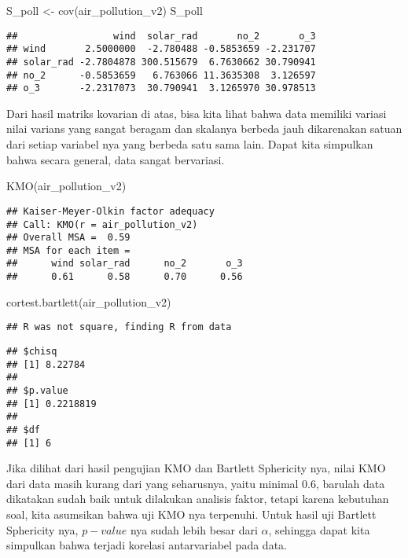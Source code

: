 \documentclass[
]{article}
\newenvironment{Shaded}{\begin{snugshade}}{\end{snugshade}}
\newcommand{\FunctionTok}[1]{\textcolor[rgb]{0.00,0.00,0.00}{#1}}
\newcommand{\NormalTok}[1]{#1}
\newcommand{\OtherTok}[1]{\textcolor[rgb]{0.56,0.35,0.01}{#1}}
\begin{document}
\begin{Shaded}
\begin{Highlighting}[]
\NormalTok{S\_poll }\OtherTok{\textless{}{-}} \FunctionTok{cov}\NormalTok{(air\_pollution\_v2)}
\NormalTok{S\_poll}
\end{Highlighting}
\end{Shaded}

\begin{verbatim}
##                 wind  solar_rad       no_2       o_3
## wind       2.5000000  -2.780488 -0.5853659 -2.231707
## solar_rad -2.7804878 300.515679  6.7630662 30.790941
## no_2      -0.5853659   6.763066 11.3635308  3.126597
## o_3       -2.2317073  30.790941  3.1265970 30.978513
\end{verbatim}

Dari hasil matriks kovarian di atas, bisa kita lihat bahwa data memiliki
variasi nilai varians yang sangat beragam dan skalanya berbeda jauh
dikarenakan satuan dari setiap variabel nya yang berbeda satu sama lain.
Dapat kita simpulkan bahwa secara general, data sangat bervariasi.

\begin{Shaded}
\begin{Highlighting}[]
\FunctionTok{KMO}\NormalTok{(air\_pollution\_v2)}
\end{Highlighting}
\end{Shaded}

\begin{verbatim}
## Kaiser-Meyer-Olkin factor adequacy
## Call: KMO(r = air_pollution_v2)
## Overall MSA =  0.59
## MSA for each item = 
##      wind solar_rad      no_2       o_3 
##      0.61      0.58      0.70      0.56
\end{verbatim}

\begin{Shaded}
\begin{Highlighting}[]
\FunctionTok{cortest.bartlett}\NormalTok{(air\_pollution\_v2)}
\end{Highlighting}
\end{Shaded}

\begin{verbatim}
## R was not square, finding R from data
\end{verbatim}

\begin{verbatim}
## $chisq
## [1] 8.22784
## 
## $p.value
## [1] 0.2218819
## 
## $df
## [1] 6
\end{verbatim}

Jika dilihat dari hasil pengujian KMO dan Bartlett Sphericity nya, nilai
KMO dari data masih kurang dari yang seharusnya, yaitu minimal 0.6,
barulah data dikatakan sudah baik untuk dilakukan analisis faktor,
tetapi karena kebutuhan soal, kita asumsikan bahwa uji KMO nya
terpenuhi. Untuk hasil uji Bartlett Sphericity nya, \(p-value\) nya
sudah lebih besar dari \(\alpha\), sehingga dapat kita simpulkan bahwa
terjadi korelasi antarvariabel pada data.
\end{document}
